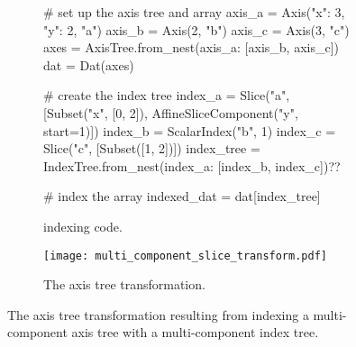 \documentclass[thesis]{subfiles}
\begin{document}
\begin{figure}
  \centering

  \begin{subfigure}{.9\textwidth}
    \begin{pyalg2}
      # set up the axis tree and array
      axis_a = Axis({"x": 3, "y": 2}, "a")
      axis_b = Axis(2, "b")
      axis_c = Axis(3, "c")
      axes = AxisTree.from_nest({axis_a: [axis_b, axis_c]})
      dat = Dat(axes)

      # create the index tree
      index_a = Slice("a", [Subset("x", [0, 2]),
                            AffineSliceComponent("y", start=1)])
      index_b = ScalarIndex("b", 1)
      index_c = Slice("c", [Subset([1, 2])])
      index_tree = IndexTree.from_nest({index_a: [index_b, index_c]})?\label{code:multi_component_make_index_tree}?

      # index the array
      indexed_dat = dat[index_tree]
    \end{pyalg2}

    \caption{ indexing code.}
    \label{fig:multi_component_slice_code}
  \end{subfigure}

  \vspace{1em}

  \begin{subfigure}{\textwidth}
    \centering
    \texttt{[image: multi\_component\_slice\_transform.pdf]}
    \caption{
      The axis tree transformation.
    }
    \label{fig:multi_component_slice_transform_flowchart}
  \end{subfigure}

  \caption{
    The axis tree transformation resulting from indexing a multi-component axis tree with a multi-component index tree.
  }
  \label{fig:multi_component_slice}
\end{figure}
\end{document}
